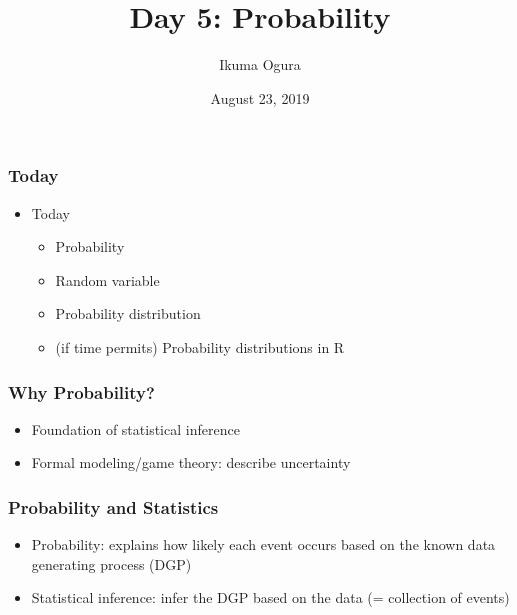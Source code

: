 \documentclass[pdflatex, 12pt]{beamer}
\title[Math Camp: Day 5]{Day 5: Probability}
\author[Ikuma Ogura]{Ikuma Ogura}
\institute[Georgetown]{Ph.D. student, Department of Government, Georgetown University}
\date[August 23, 2019]{August 23, 2019}
\begin{document}
\begin{frame}
\frametitle{}
\titlepage
\end{frame}

\begin{frame}
\frametitle{Today}
\begin{itemize}
\item Today
 \begin{itemize}
 \item Probability
 \item Random variable
 \item Probability distribution
 \item (if time permits) Probability distributions in R
 \end{itemize}
\end{itemize}
\end{frame}

\begin{frame}
\frametitle{Why Probability?}
\begin{itemize}
\item Foundation of statistical inference
\vspace{0.4cm}
\item Formal modeling/game theory: describe uncertainty
\end{itemize}
\end{frame}

\begin{frame}
\frametitle{Probability and Statistics}
\vspace{0.4cm}
\begin{itemize}
\item Probability: explains how likely each event occurs based on the known data generating process (DGP)
\vspace{0.4cm}
\item Statistical inference: infer the DGP based on the data (= collection of events)
\end{itemize}
\end{frame}
\end{document}
